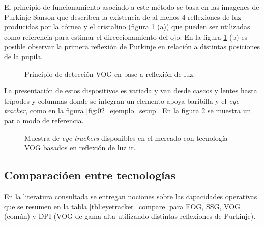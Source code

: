 \documentclass[../main.tex]{subfiles}
\begin{document}
\begin{enumerate}
				El principio de funcionamiento asociado a este método se basa en las imagenes de Purkinje-Sanson que describen la existencia de al menos 4 reflexiones de luz producidas por la córnea y el cristalino (figura \ref{fig:02_et_vog1} (a)) que pueden ser utilizadas como referencia para estimar el direccionamiento del ojo. En la figura \ref{fig:02_et_vog1} (b) es posible observar la primera reflexión de Purkinje en relación a distintas posiciones de la pupila.
				\begin{figure}[H]
					\centering
					\hspace{5mm}
					\caption[Principio de detección VOG en base a reflexión de luz]{Principio de detección VOG en base a reflexión de luz\cite{dissertation:eyetrackers}.}
					\label{fig:02_et_vog1}
				\end{figure}

				La presentación de estos dispositivos es variada y van desde cascos y lentes hasta trípodes y columnas donde se integran un elemento apoya-baribilla y el \textit{eye tracker}, como en la figura \ref{fig:02_ejemplo_setup}. En la figura \ref{fig:02_et_vog2} se muestra un par a modo de referencia. 
				\begin{figure}[H]
					\centering
					\hspace{5mm}
					\caption[Muestra de \textit{eye trackers} disponibles en el mercado con tecnología VOG basados en reflexión de luz \acrshort{ir}]{Muestra de \textit{eye trackers} disponibles en el mercado con tecnología VOG basados en reflexión de luz \acrshort{ir}\footnotemark.}
					\label{fig:02_et_vog2}
				\end{figure}

			\end{enumerate}

		\subsection{Comparacióen entre tecnologías}
		\label{sub:02_comparativa_eyetracker}
			En la literatura consultada \cite{dissertation:eyetrackers, article:eyetracker_eggert, article:eyetracker_richardson} se entregan nociones sobre las capacidades operativas que se resumen en la tabla \ref{tbl:eyetracker_compare} para EOG, SSG, VOG (común) y DPI (VOG de gama alta utilizando distintas reflexiones de Purkinje). 
\end{document}
